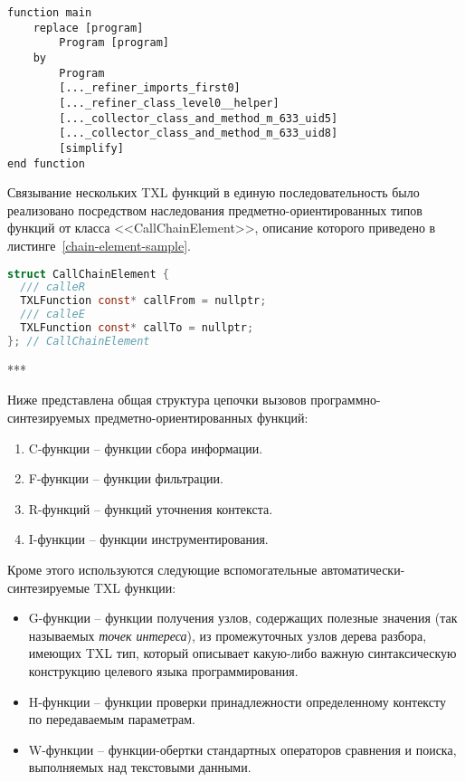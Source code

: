 \begin{lstlisting}[frame=single, language=TXL, label={main-example}, caption={Пример исходного текста главной функции}]
function main
	replace [program]
		Program [program]
	by
		Program
		[..._refiner_imports_first0]
		[..._refiner_class_level0__helper]
		[..._collector_class_and_method_m_633_uid5]
		[..._collector_class_and_method_m_633_uid8]
		[simplify]
end function
\end{lstlisting}

Связывание нескольких TXL функций в единую последовательность было реализовано посредством наследования предметно-ориентированных типов функций от класса <<CallChainElement>>, описание которого приведено в листинге~\ref{chain-element-sample}.

\begin{lstlisting}[frame=single, language=C, label={chain-element-sample}, caption={Исходный код определения элемента цепочки вызовов}]
struct CallChainElement {
  /// calleR
  TXLFunction const* callFrom = nullptr;
  /// calleE
  TXLFunction const* callTo = nullptr;
}; // CallChainElement
\end{lstlisting}

***

Ниже представлена общая структура цепочки вызовов программно-синтезируемых предметно-ориентированных функций:
\begin{enumerate}[noitemsep]
  \item C-функции -- функции сбора информации.
  \item F-функции -- функции фильтрации.
  \item R-функций -- функций уточнения контекста.
  \item I-функции -- функции инструментирования.
\end{enumerate}

Кроме этого используются следующие вспомогательные автоматически-синтезируемые TXL функции:
\begin{itemize}
  \item G-функции -- функции получения узлов, содержащих полезные значения (так называемых \textit{точек интереса}), из промежуточных узлов дерева разбора, имеющих TXL тип, который описывает какую-либо важную синтаксическую конструкцию целевого языка программирования.
  \item H-функции -- функции проверки принадлежности определенному контексту по передаваемым параметрам.
  \item W-функции -- функции-обертки стандартных операторов сравнения и поиска, выполняемых над текстовыми данными.
\end{itemize}

